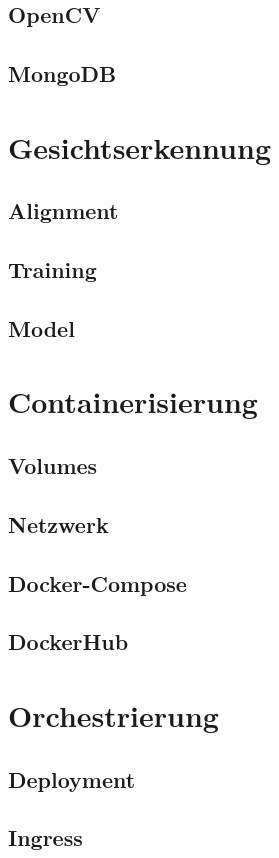 \subsection{OpenCV}
\subsection{MongoDB}

\section{Gesichtserkennung}
\subsection{Alignment}
\subsection{Training}
\subsection{Model}

\section{Containerisierung}
\subsection{Volumes}
\subsection{Netzwerk}
\subsection{Docker-Compose}
\subsection{DockerHub}

\section{Orchestrierung}
\subsection{Deployment}
\subsection{Ingress}
